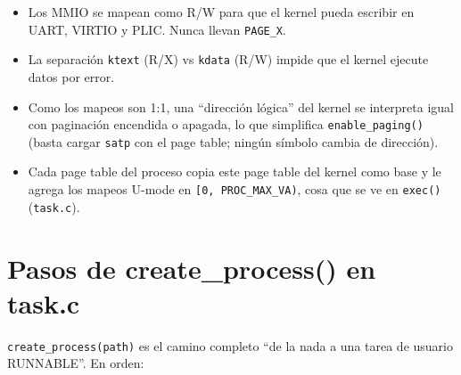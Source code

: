 \documentclass[11pt,a4paper]{article}
\begin{document}
\begin{itemize}[leftmargin=1.4em]
    \item Los MMIO se mapean como R/W para que el kernel pueda escribir en UART,
    VIRTIO y PLIC. Nunca llevan \texttt{PAGE\_X}.
    \item La separación \texttt{ktext} (R/X) vs \texttt{kdata} (R/W) impide que el
    kernel ejecute datos por error.
    \item Como los mapeos son 1:1, una ``dirección lógica'' del kernel se
    interpreta igual con paginación encendida o apagada, lo que simplifica
    \texttt{enable\_paging()} (basta cargar \texttt{satp} con el page table;
    ningún símbolo cambia de dirección).
    \item Cada page table del proceso copia este page table del kernel como base y
    le agrega los mapeos U-mode en \texttt{[0, PROC\_MAX\_VA)}, cosa que se ve en
    \texttt{exec()} (\texttt{task.c}).
\end{itemize}

\section{Pasos de create\_process() en task.c}

\texttt{create\_process(path)} es el camino completo ``de la nada a una tarea de
usuario RUNNABLE''. En orden:
\end{document}
